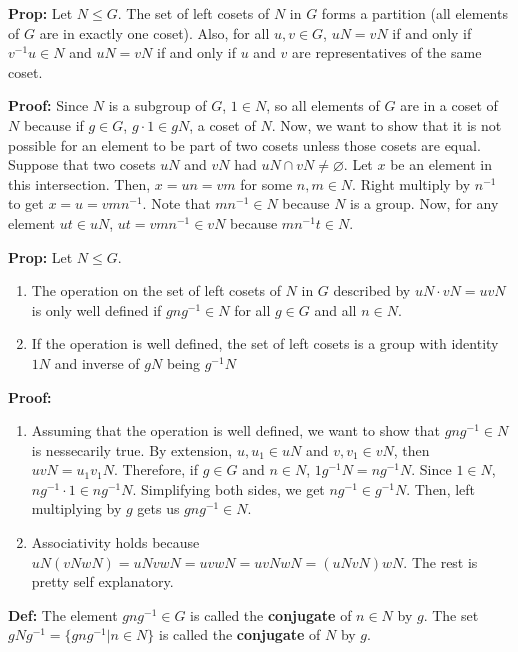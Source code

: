 \documentclass{article}
\begin{document}
\textbf{Prop:} Let $N \leq G$. The set of left cosets of $N$ in $G$ forms a partition (all elements of $G$ are in exactly one coset). Also, for all $u,v \in G$, $uN = vN$ if and only if $v ^{-1} u \in N$ and $uN = vN$ if and only if $u$ and $v$ are representatives of the same coset.

\textbf{Proof:} Since $N$ is a subgroup of $G$, $1 \in N$, so all elements of $G$ are in a coset of $N$ because if $g \in G$, $g \cdot 1 \in gN$, a coset of $N$. Now, we want to show that it is not possible for an element to be part of two cosets unless those cosets are equal. Suppose that two cosets $uN$ and $vN$ had $uN \cap vN \neq \varnothing$. Let $x$ be an element in this intersection. Then, $x = un = vm$ for some $n, m \in N$. Right multiply by $n ^{-1}$ to get $x = u = vmn ^{-1}$. Note that $mn ^{-1} \in N$ because $N$ is a group. Now, for any element $ut \in uN$, $ut = vmn ^{-1} \in vN$ because $mn ^{-1}t \in N$.

\textbf{Prop:} Let $N \leq G$.

\begin{enumerate}
    \item The operation on the set of left cosets of $N$ in $G$ described by $uN \cdot vN = uvN$ is only well defined if $gng ^{-1} \in N$ for all $g \in G$ and all $n \in N$.
    \item If the operation is well defined, the set of left cosets is a group with identity $1N$ and inverse of $gN$ being $g ^{-1}N$
    
\end{enumerate}

\textbf{Proof:} 
\begin{enumerate}
    \item Assuming that the operation is well defined, we want to show that $gng ^{-1}  \in N$ is nessecarily true. By extension, $u, u_1 \in uN$ and $v, v_1 \in vN$, then $uvN = u_1 v_1 N$. Therefore, if $g \in G$ and $n \in N$, $1g ^{-1} N = ng ^{-1} N$. Since $1 \in N$, $ng ^{-1} \cdot 1 \in ng ^{-1} N$. Simplifying both sides, we get $ng ^{-1} \in g ^{-1} N$. Then, left multiplying by $g$ gets us $gng ^{-1}  \in N$.
    \item Associativity holds because $uN(vNwN) = uNvwN = uvwN = uvNwN = (uNvN)wN$. The rest is pretty self explanatory.
\end{enumerate}

\textbf{Def:} The element $gng ^{-1} \in G$ is called the \textbf{conjugate} of $n \in N$ by $g$. The set $gNg ^{-1}  = \{gng ^{-1} \vert n\in N\}$ is called the \textbf{conjugate} of $N$ by $g$.
\end{document}
